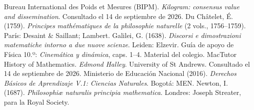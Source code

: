 \documentclass[11pt]{article}
\begin{document}
\begin{referencias}
 Bureau International des Poids et Mesures (BIPM). \emph{Kilogram: consensus
  value and dissemination}. Consultado el 14 de septiembre de 2026.
 Du Châtelet, É. (1759). \emph{Principes mathématiques de la
  philosophie naturelle} (2 vols., 1756--1759). París: Desaint \& Saillant; Lambert.
 Galilei, G. (1638). \emph{Discorsi e dimostrazioni matematiche intorno
  a due nuove scienze}. Leiden: Elzevir.
 Guía de apoyo de Física 10.º: \emph{Cinemática y dinámica}, caps. 1--4.
  Material del colegio.
 MacTutor History of Mathematics. \emph{Edmond Halley}. University of St
  Andrews. Consultado el 14 de septiembre de 2026.
 Ministerio de Educación Nacional (2016). \emph{Derechos Básicos de
  Aprendizaje V.1: Ciencias Naturales}. Bogotá: MEN.
 Newton, I. (1687). \emph{Philosophiæ naturalis principia mathematica}.
  Londres: Joseph Streater, para la Royal Society.

\end{referencias}
\end{document}
